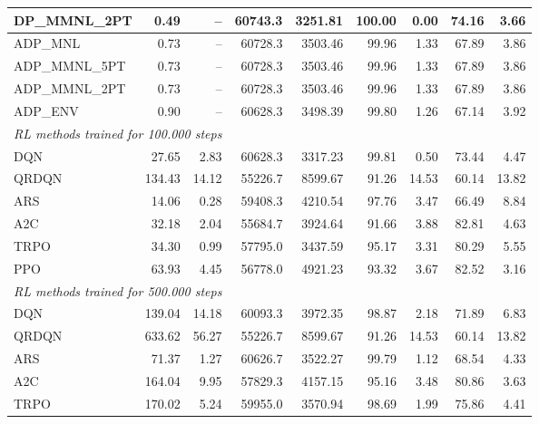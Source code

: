 \begin{samepage}
\begin{center}
\begin{tabular}{l|rr|rr|rr|rr}
    DP\_MMNL\_2PT &     0.49 &    -- &    60743.3 &    3251.81 &  100.00 &    0.00 &   74.16 &    3.66 \\
    \midrule
    ADP\_MNL     &     0.73 &    -- &    60728.3 &    3503.46 &   99.96 &    1.33 &   67.89 &    3.86 \\
    ADP\_MMNL\_5PT &     0.73 &    -- &    60728.3 &    3503.46 &   99.96 &    1.33 &   67.89 &    3.86 \\
    ADP\_MMNL\_2PT &     0.73 &    -- &    60728.3 &    3503.46 &   99.96 &    1.33 &   67.89 &    3.86 \\
    ADP\_ENV     &     0.90 &    -- &    60628.3 &    3498.39 &   99.80 &    1.26 &   67.14 &    3.92 \\
    \midrule
    \multicolumn{9}{l}{\textit{RL methods trained for 100.000 steps}} \\
    \midrule
    DQN          &    27.65 &     2.83 &    60628.3 &    3317.23 &   99.81 &    0.50 &   73.44 &    4.47 \\
    QRDQN        &   134.43 &    14.12 &    55226.7 &    8599.67 &   91.26 &   14.53 &   60.14 &   13.82 \\
    ARS          &    14.06 &     0.28 &    59408.3 &    4210.54 &   97.76 &    3.47 &   66.49 &    8.84 \\
    A2C          &    32.18 &     2.04 &    55684.7 &    3924.64 &   91.66 &    3.88 &   82.81 &    4.63 \\
    TRPO         &    34.30 &     0.99 &    57795.0 &    3437.59 &   95.17 &    3.31 &   80.29 &    5.55 \\
    PPO          &    63.93 &     4.45 &    56778.0 &    4921.23 &   93.32 &    3.67 &   82.52 &    3.16 \\
    \midrule
    \multicolumn{9}{l}{\textit{RL methods trained for 500.000 steps}} \\
    \midrule
    DQN          &   139.04 &    14.18 &    60093.3 &    3972.35 &   98.87 &    2.18 &   71.89 &    6.83 \\
    QRDQN        &   633.62 &    56.27 &    55226.7 &    8599.67 &   91.26 &   14.53 &   60.14 &   13.82 \\
    ARS          &    71.37 &     1.27 &    60626.7 &    3522.27 &   99.79 &    1.12 &   68.54 &    4.33 \\
    A2C          &   164.04 &     9.95 &    57829.3 &    4157.15 &   95.16 &    3.48 &   80.86 &    3.63 \\
    TRPO         &   170.02 &     5.24 &    59955.0 &    3570.94 &   98.69 &    1.99 &   75.86 &    4.41 \\

\end{tabular}
\end{center}
\end{samepage}
